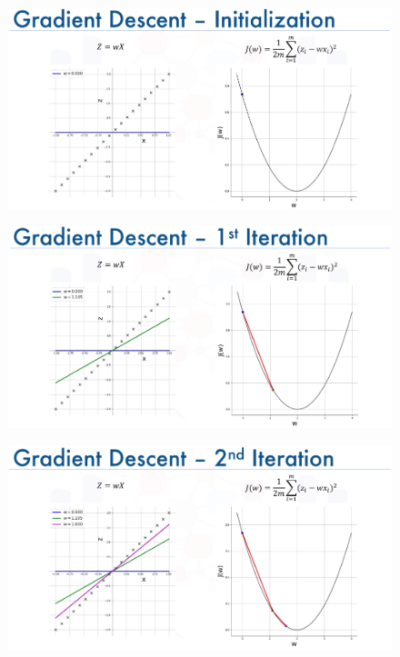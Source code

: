 \documentclass[10pt, compress]{beamer}
\begin{document}
\begin{frame}
  \begin{figure}
    \includegraphics[width=1\linewidth]{imgs/edx_dl_keras/gd5}
  \end{figure}
\end{frame}

\begin{frame}
  \begin{figure}
    \includegraphics[width=1\linewidth]{imgs/edx_dl_keras/gd6}
  \end{figure}
\end{frame}

\begin{frame}
  \begin{figure}
    \includegraphics[width=1\linewidth]{imgs/edx_dl_keras/gd7}
  \end{figure}
\end{frame}
\end{document}
